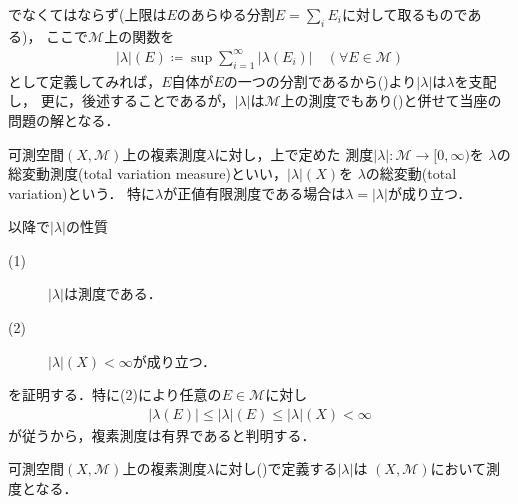 	でなくてはならず(上限は$E$のあらゆる分割$E = \sum_{i}E_i$に対して取るものである)，
	ここで$\mathcal{M}$上の関数を
	\begin{align}
		|\lambda|(E) \coloneqq \sup{}{\sum_{i=1}^{\infty} |\lambda(E_i)|} \quad (\forall E \in \mathcal{M})
		\label{radon_nikodym_3}
	\end{align}
	として定義してみれば，$E$自体が$E$の一つの分割であるから()より$|\lambda|$は$\lambda$を支配し，
	更に，後述することであるが，$|\lambda|$は$\mathcal{M}$上の測度でもあり()と併せて当座の問題の解となる．
	
	\begin{itembox}[l]{}
		\begin{dfn}
			可測空間$(X,\mathcal{M})$上の複素測度$\lambda$に対し，上で定めた
			測度$|\lambda|:\mathcal{M} \longrightarrow [0,\infty)$を
			$\lambda$の総変動測度(total variation measure)といい，$|\lambda|(X)$を
			$\lambda$の総変動(total variation)という．
			特に$\lambda$が正値有限測度である場合は$\lambda = |\lambda|$が成り立つ．\footnotemark
		\end{dfn}
	\end{itembox}
	
	以降で$|\lambda|$の性質
	\begin{description}
		\item[(1)] $|\lambda|$は測度である．
		\item[(2)] $|\lambda|(X) < \infty$が成り立つ．
	\end{description}
	を証明する．特に(2)により任意の$E \in \mathcal{M}$に対し
	\begin{align}
		|\lambda(E)| \leq |\lambda|(E) \leq |\lambda|(X) < \infty
	\end{align}
	が従うから，複素測度は有界であると判明する．

	\begin{itembox}[l]{}
		\begin{thm}
			可測空間$(X,\mathcal{M})$上の複素測度$\lambda$に対し()で定義する$|\lambda|$は
			$(X,\mathcal{M})$において測度となる．
		\end{thm}
	\end{itembox}
	
